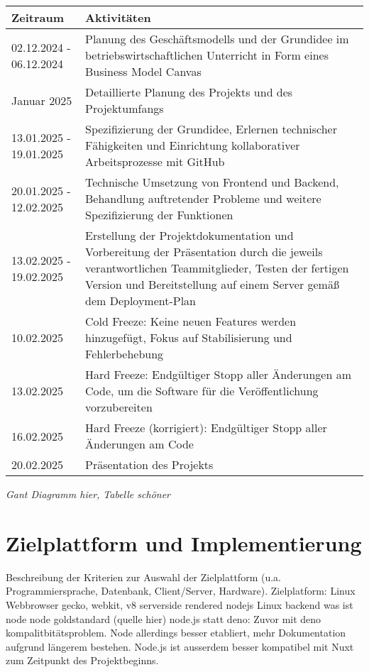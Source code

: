 \documentclass[a4paper,12pt]{article}
\begin{document}
\newpage
\begin{longtable}{|p{4cm}|p{11cm}|}
	\hline
	\textbf{Zeitraum} & \textbf{Aktivitäten} \\
	\hline
	02.12.2024 - 06.12.2024 & Planung des Geschäftsmodells und der Grundidee im betriebswirtschaftlichen Unterricht in Form eines Business Model Canvas \\
	\hline
	Januar 2025 & Detaillierte Planung des Projekts und des Projektumfangs \\
	\hline
	13.01.2025 - 19.01.2025 & Spezifizierung der Grundidee, Erlernen technischer Fähigkeiten und Einrichtung kollaborativer Arbeitsprozesse mit GitHub \\
	\hline
	20.01.2025 - 12.02.2025 & Technische Umsetzung von Frontend und Backend, Behandlung auftretender Probleme und weitere Spezifizierung der Funktionen \\
	\hline
	13.02.2025 - 19.02.2025 & Erstellung der Projektdokumentation und Vorbereitung der Präsentation durch die jeweils verantwortlichen Teammitglieder, Testen der fertigen Version und Bereitstellung auf einem Server gemäß dem Deployment-Plan \\
	\hline
	10.02.2025 & Cold Freeze: Keine neuen Features werden hinzugefügt, Fokus auf Stabilisierung und Fehlerbehebung \\
	\hline
	13.02.2025 & Hard Freeze: Endgültiger Stopp aller Änderungen am Code, um die Software für die Veröffentlichung vorzubereiten \\
	\hline
	16.02.2025 & Hard Freeze (korrigiert): Endgültiger Stopp aller Änderungen am Code \\
	\hline
	20.02.2025 & Präsentation des Projekts \\
	\hline
\end{longtable}

\textit{
Gant Diagramm hier, Tabelle schöner
}

\newpage \section{Zielplattform und Implementierung}
Beschreibung der Kriterien
zur Auswahl der Zielplattform (u.a. Programmiersprache, Datenbank,
Client/Server, Hardware).
Zielplatform: Linux 
Webbrowser 
gecko, webkit, v8 serverside rendered 
nodejs Linux backend
was ist node node goldstandard (quelle hier) 
node.js statt deno: Zuvor mit deno kompalitbitätsproblem. Node allerdings besser etabliert, mehr Dokumentation aufgrund längerem bestehen. Node.js ist ausserdem besser kompatibel mit Nuxt zum Zeitpunkt des Projektbeginns. 
\end{document}
